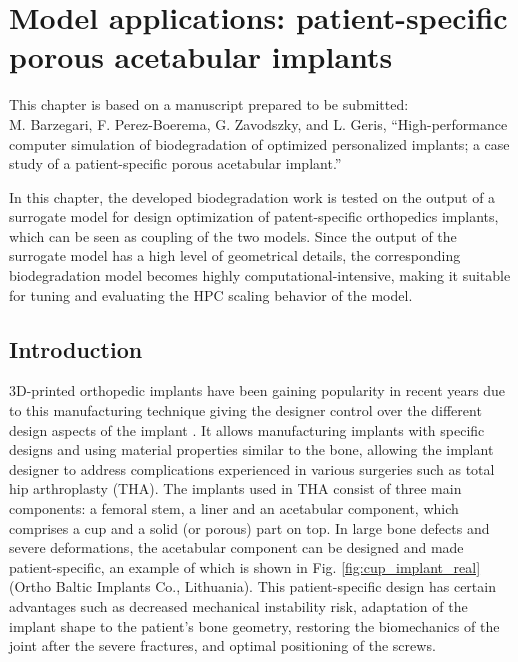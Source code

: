 \chapter{Model applications: patient-specific porous acetabular implants}\label{ch:cup}

\begin{tcolorbox}
This chapter is based on a manuscript prepared to be submitted:\\
M. Barzegari, F. Perez-Boerema, G. Zavodszky, and L. Geris, ``High-performance computer simulation of biodegradation of optimized personalized implants; a case study of a patient-specific porous acetabular implant.''
\end{tcolorbox}

In this chapter, the developed biodegradation work is tested on the output of a surrogate model for design optimization of patent-specific orthopedics implants, which can be seen as coupling of the two models. Since the output of the surrogate model has a high level of geometrical details, the corresponding biodegradation model becomes highly computational-intensive, making it suitable for tuning and evaluating the HPC scaling behavior of the model.

\section{Introduction}


3D-printed orthopedic implants have been gaining popularity in recent years due to this manufacturing technique giving the designer control over the different design aspects of the implant \cite{Kumar2021,Yadav2020}. It allows manufacturing implants with specific designs and using material properties similar to the bone, allowing the implant designer to address complications experienced in various surgeries such as total hip arthroplasty (\gls{THA}). The implants used in \gls{THA} consist of three main components: a femoral stem, a liner and an acetabular component, which comprises a cup and a solid (or porous) part on top. In large bone defects and severe deformations, the acetabular component can be designed and made patient-specific, an example of which is shown in Fig. \ref{fig:cup_implant_real} (Ortho Baltic Implants Co., Lithuania). This patient-specific design has certain advantages such as decreased mechanical instability risk, adaptation of the implant shape to the patient's bone geometry, restoring the biomechanics of the joint after the severe fractures, and optimal positioning of the screws.

